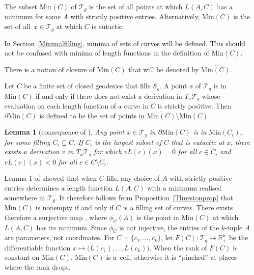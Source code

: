 \documentclass[pdftex]{sigma}
\numberwithin{equation}{section}
\newtheorem{Lemma}[Theorem]{Lemma}
\begin{document}
\begin{Definition}
The subset $\mathrm{Min}(C)$ of $\mathcal{T}_{g}$ is the set of all points at which $L(A,C)$ has a minimum for some $A$ with strictly positive entries. Alternatively, $\mathrm{Min}(C)$ is the set of all~${x\in \mathcal{T}_{g}}$ at which $C$ is eutactic.
\end{Definition}


In Section \ref{Minimalfilling}, minima of sets of curves will be defined. This should not be confused with minima of length functions in the definition of $\mathrm{Min}(C)$.

There is a notion of closure of $\mathrm{Min}(C)$ that will be denoted by $\overline{\mathrm{Min}(C)}$.

\begin{Definition}\label{defnmod}
Let $C$ be a finite set of closed geodesics that fills $S_{g}$. A point $x$ of $\mathcal{T}_{g}$ is in $\overline{\mathrm{Min}(C)}$ if and only if there does not exist a derivation in $T_{x}\mathcal{T}_{g}$ whose evaluation on each length function of a curve in $C$ is strictly positive. Then $\partial \mathrm{Min}(C)$ is defined to be the set of points in $\overline{\mathrm{Min}(C)}\setminus \mathrm{Min}(C)$
\end{Definition}

\begin{Lemma}[{consequence of \cite[Lemma 14 and Theorem 15]{SchmutzMorse}}]
\label{lemma14}
Any point $x\in\mathcal{T}_{g}$ in $\partial\mathrm{Min}(C)$ is in $\mathrm{Min}(C_{i})$, for some filling $C_{i}\subsetneq C$. If $C_{i}$ is the largest subset of $C$ that is eutactic at $x$, there exists a derivation $v$ in $T_{x}\mathcal{T}_{g}$ for which $vL(c)(x)=0$ for all $c\in C_{i}$ and $vL(c)(x)<0$ for all $c\in C\setminus C_{i}$.
\end{Lemma}

Lemma 1 of \cite{SchmutzMorse} showed that when $C$ fills, any choice of $A$ with strictly positive entries determines a length function $L(A,C)$ with a minimum realised somewhere in $\mathcal{T}_{g}$. It therefore follows from Proposition~\ref{Thurstonprop} that $\mathrm{Min}(C)$ is nonempty if and only if $C$ is a filling set of curves. There exists therefore a surjective map , where $\phi_{C}(A)$ is the point in $\mathrm{Min}(C)$ at which $L(A,C)$ has its minimum. Since $\phi_{C}$ is not injective, the entries of the $k$-tuple $A$ are parameters, not coordinates. For $C=\{c_{1}, \dots, c_{k}\}$, let $F(C)\colon\mathcal{T}_{g}\rightarrow \mathbb{R}^{k}_{+}$ be the differentiable function $x\mapsto \bigl(L(c_{1}), \dots, L(c_{k})\bigr)$. When the rank of $F(C)$ is constant on $\mathrm{Min}(C)$, $\mathrm{Min}(C)$ is a~cell, otherwise it is ``pinched'' at places where the rank drops.
\end{document}
